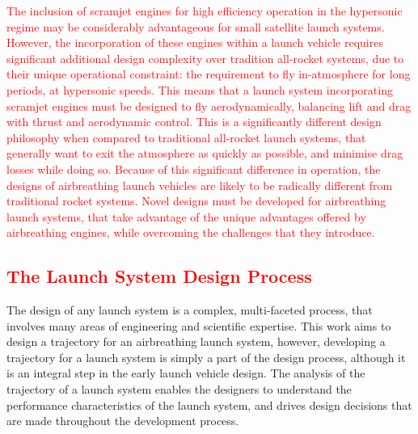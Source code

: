     \textcolor{red}{The inclusion of scramjet engines for high efficiency operation in the hypersonic regime may be considerably advantageous for small satellite launch systems. However, the incorporation of these engines within a launch vehicle requires significant additional design complexity over tradition all-rocket systems, due to their unique operational constraint: the requirement to fly in-atmosphere for long periods, at hypersonic speeds. This means that a launch system incorporating scramjet engines must be designed to fly aerodynamically, balancing lift and drag with thrust and aerodynamic control. 
    This is a significantly different design philosophy when compared to traditional all-rocket launch systems, that generally want to exit the atmosphere as quickly as possible, and minimise drag losses while doing so. Because of this significant difference in operation, the designs of airbreathing launch vehicles are likely to be radically different from traditional rocket systems. Novel designs must be developed for airbreathing launch systems, that take advantage of the unique advantages offered by airbreathing engines, while overcoming the challenges that they introduce. 
    	}
    
    
    
    
    
    \textcolor{red}{
    	\section{The Launch System Design Process}
    }
    
    The design of any launch system is a complex, multi-faceted process, that involves many areas of engineering and scientific expertise. This work aims to design a trajectory for an airbreathing launch system, however, developing a trajectory for a launch system is simply a part of the design process, although it is an integral step in the early launch vehicle design. The analysis of the trajectory of a launch system enables the designers to understand the performance characteristics of the launch system, and drives design decisions that are made throughout the development process. 
    

